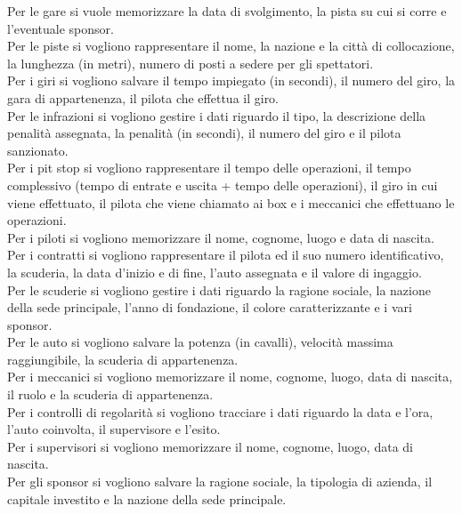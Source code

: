 \documentclass[11pt]{article}
\begin{document}
Per le gare si vuole memorizzare la data di svolgimento, la pista su cui si corre e l'eventuale sponsor. \\
Per le piste si vogliono rappresentare il nome, la nazione e la città di collocazione, la lunghezza (in metri), numero di posti a sedere per gli spettatori. \\
Per i giri si vogliono salvare il tempo impiegato (in secondi), il numero del giro, la gara di appartenenza, il pilota che effettua il giro. \\
Per le infrazioni si vogliono gestire i dati riguardo il tipo, la descrizione della penalità assegnata, la penalità (in secondi), il numero del giro e il pilota sanzionato. \\
Per i pit stop si vogliono rappresentare il tempo delle operazioni, il tempo complessivo (tempo di entrate e uscita + tempo delle operazioni), il giro in cui viene effettuato, il pilota che viene chiamato ai box e i meccanici che effettuano le operazioni. \\
Per i piloti si vogliono memorizzare il nome, cognome, luogo e data di nascita. \\
Per i contratti si vogliono rappresentare il pilota ed il suo numero identificativo, la scuderia, la data d'inizio e di fine, l'auto assegnata e il valore di ingaggio. \\
Per le scuderie si vogliono gestire i dati riguardo la ragione sociale, la nazione della sede principale, l'anno di fondazione, il colore caratterizzante e i vari sponsor. \\ 
Per le auto si vogliono salvare la potenza (in cavalli), velocità massima raggiungibile, la scuderia di appartenenza. \\
Per i meccanici si vogliono memorizzare il nome, cognome, luogo, data di nascita, il ruolo e la scuderia di appartenenza. \\
Per i controlli di regolarità si vogliono tracciare i dati riguardo la data e l'ora, l'auto coinvolta, il supervisore e l'esito. \\
Per i supervisori si vogliono memorizzare il nome, cognome, luogo, data di nascita. \\
Per gli sponsor si vogliono salvare la ragione sociale, la tipologia di azienda, il capitale investito e la nazione della sede principale.
\end{document}
